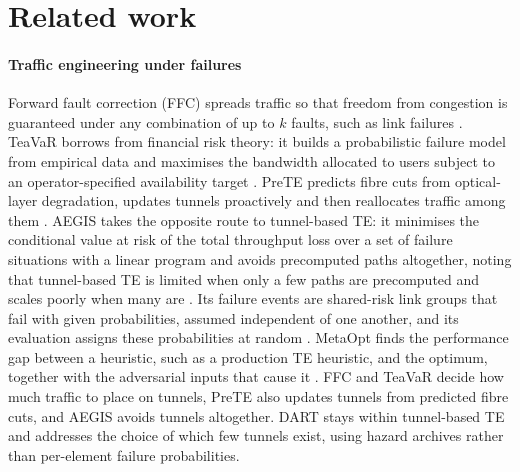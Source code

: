 \documentclass[preprint,12pt]{elsarticle}
\begin{document}
\section{Related work}
\label{sec:related}

\paragraph{Traffic engineering under failures}
Forward fault correction (FFC) spreads traffic so that freedom from congestion is guaranteed under any combination of up to $k$ faults, such as link failures \cite{ffc14}. TeaVaR borrows from financial risk theory: it builds a probabilistic failure model from empirical data and maximises the bandwidth allocated to users subject to an operator-specified availability target \cite{teavar19}. PreTE predicts fibre cuts from optical-layer degradation, updates tunnels proactively and then reallocates traffic among them \cite{prete25}. AEGIS takes the opposite route to tunnel-based TE: it minimises the conditional value at risk of the total throughput loss over a set of failure situations with a linear program and avoids precomputed paths altogether, noting that tunnel-based TE is limited when only a few paths are precomputed and scales poorly when many are \cite{aegis26}. Its failure events are shared-risk link groups that fail with given probabilities, assumed independent of one another, and its evaluation assigns these probabilities at random \cite{aegis26}. MetaOpt finds the performance gap between a heuristic, such as a production TE heuristic, and the optimum, together with the adversarial inputs that cause it \cite{metaopt24}. FFC and TeaVaR decide how much traffic to place on tunnels, PreTE also updates tunnels from predicted fibre cuts, and AEGIS avoids tunnels altogether. DART stays within tunnel-based TE and addresses the choice of which few tunnels exist, using hazard archives rather than per-element failure probabilities.
\end{document}
